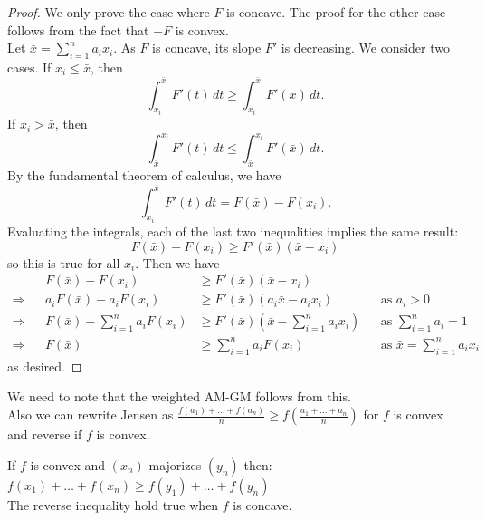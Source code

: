 \begin{proof}
We only prove the case where $F$ is concave. The proof for the other case follows from the fact that $-F$ is convex.\\ 
Let $\bar{x}=\sum_{i=1}^n a_ix_i$. As $F$ is concave, its slope $F'$ is decreasing. We consider two cases.
If $x_i \le \bar{x}$, then\[\int_{x_i}^{\bar{x}} F'(t) \, dt \ge \int_{x_i}^{\bar{x}} F'(\bar{x}) \, dt .\]
If $x_i > \bar{x}$, then\[\int_{\bar{x}}^{x_i} F'(t) \, dt \le \int_{\bar{x}}^{x_i} F'(\bar{x}) \, dt .\]
By the fundamental theorem of calculus, we have\[\int_{x_i}^{\bar{x}} F'(t) \, dt = F(\bar{x}) - F(x_i) .\]
Evaluating the integrals, each of the last two inequalities implies the same result:\[F(\bar{x})-F(x_i) \ge F'(\bar{x})(\bar{x}-x_i)\]
so this is true for all $x_i$. 
Then we have
\begin{align*} && F(\bar{x})-F(x_i) &\ge F'(\bar{x})(\bar{x}-x_i) \\ \Longrightarrow && a_i F(\bar{x}) - a_i F(x_i) &\ge F'(\bar{x})(a_i\bar{x}-a_i x_i) && \text{as } a_i>0 \\ \Longrightarrow && F(\bar{x}) - \sum_{i=1}^n a_i F(x_i) &\ge F'(\bar{x})\left(\bar{x} - \sum_{i=1}^n a_i x_i \right) && \text{as } \sum_{i=1}^n a_i = 1 \\ \Longrightarrow && F(\bar{x}) &\ge \sum_{i=1}^n a_i F(x_i) && \text{as } \bar{x}=\sum_{i=1}^n a_ix_i \end{align*}as desired.
\end{proof}
We need to note that the weighted AM-GM follows from this.\\
Also we can rewrite Jensen as $\frac{f(a_1)+\dots+f(a_n)}{n} \geq f(\frac{a_1+\dots+a_n}{n})$ for $f$ is convex and reverse if $f$ is convex.\\
\begin{theorem}
    If $f$ is convex and $(x_n)$ majorizes $(y_n)$ then:\\
    $f(x_1)+\dots+f(x_n) \geq f(y_1)+\dots+f(y_n)$\\
    The reverse inequality hold true when $f$ is concave.\\
\end{theorem}

